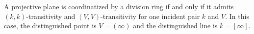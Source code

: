 A projective plane is coordinatized by a division ring if and only if it admits $(k,k)$-transitivity and $(V,V)$-transitivity for one incident pair $k$ and $V$. In this case, the distinguished point is $V = (\infty)$ and the distinguished line is $k = [\infty]$.
